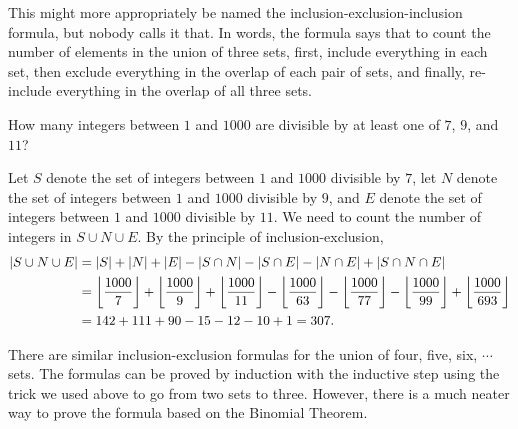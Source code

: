This might more appropriately be named the inclusion-exclusion-inclusion formula, but nobody calls
it that. In words, the formula says that to count the number of elements in the union of three
sets, first, include everything in each set, then exclude everything in the overlap of each pair
of sets, and finally, re-include everything in the overlap of all three sets.

\begin{exmp}
How many integers between $1$ and $1000$ are divisible by at least one of
$7$, $9$, and $11$?
\end{exmp}
\begin{soln}Let
 $S$ denote the set of integers between $1$ and $1000$ divisible by $7$, let
 $N$ denote the set of integers between $1$ and $1000$ divisible by $9$, and
 $E$ denote the set of integers between $1$ and $1000$ divisible by $11$.
 We need to count the number of integers in $S\cup N \cup E$. By the
 principle of inclusion-exclusion,
 \begin{align*}
  |S\cup N \cup  E| &= |S|+|N|+|E| -|S\cap N| - |S\cap E|-|N\cap E| + |S\cap N\cap E| \\ 
  &= \left\lfloor{{1000}\over7}\right\rfloor+  \left\lfloor{{1000}\over9}\right\rfloor+
  \left\lfloor{{1000}\over{11}}\right\rfloor- \left\lfloor{{1000}\over63}\right\rfloor-
  \left\lfloor{{1000}\over{77}}\right\rfloor-\left\lfloor{{1000}\over{99}}\right\rfloor
  +\left\lfloor{{1000}\over{693}}\right\rfloor \\
  &= 142+111+90-15-12-10 + 1 = 307.
 \end{align*}
\end{soln}

\clearpage
There are similar inclusion-exclusion formulas for the union of four, five, six, $\cdots$ sets.
The formulas can be proved by induction with the inductive step using the trick we 
used above to go from two sets to three. However, there is a much neater way to prove the
formula based on the Binomial Theorem. 

